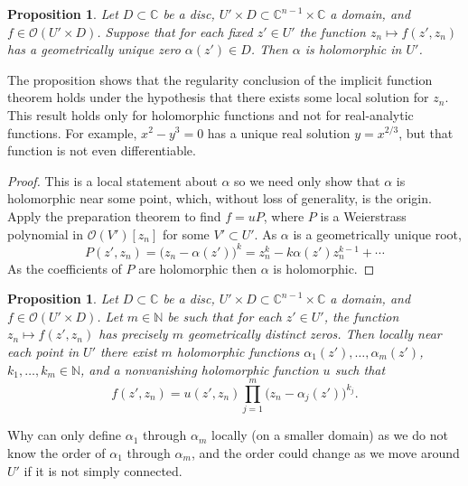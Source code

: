 \documentclass[12pt,openany]{book}
\newcommand{\C}{{\mathbb{C}}}
\newcommand{\N}{{\mathbb{N}}}
\newcommand{\sO}{{\mathcal{O}}}
\theoremstyle{plain}
\newtheorem{prop}[thm]{Proposition}
\theoremstyle{remark}
\theoremstyle{definition}
\theoremstyle{exercise}
\theoremstyle{example}
\begin{document}
\begin{prop} \label{prop:roothol}
Let $D \subset \C$ be a disc, 
$U' \times D \subset \C^{n-1} \times \C$ a domain,
and
$f \in \sO(U' \times D)$.
Suppose that for each fixed $z' \in U'$ the function
$z_n \mapsto f(z',z_n)$ has a geometrically unique zero $\alpha(z') \in D$.  Then $\alpha$ is
holomorphic in $U'$.
\end{prop}

The proposition shows that the regularity conclusion of the implicit
function theorem holds under the hypothesis that there exists some local
solution for $z_n$.  This result holds only for holomorphic
functions and not for real-analytic functions.  For example, $x^2-y^3 = 0$ has a
unique real solution $y = x^{2/3}$, but that function is not even
differentiable.

\begin{proof}
This is a local statement about $\alpha$ so we need only show
that $\alpha$ is holomorphic near some point, which, without loss
of generality, is the origin.
Apply the preparation
theorem to find $f = u P$,
where $P$ is a
Weierstrass polynomial in $\sO(V')[z_n]$ for some $V' \subset U'$.
As $\alpha$ is a geometrically unique root,
\begin{equation*}
P(z',z_n) = {\bigl(z_n-\alpha(z') \bigr)}^k = z_n^k - k \alpha(z') z_n^{k-1}
+ \cdots
\end{equation*}
As the coefficients of $P$ are holomorphic then $\alpha$ is holomorphic.
\end{proof}

\begin{prop} \label{prop:rootshol}
Let $D \subset \C$ be a disc, 
$U' \times D \subset \C^{n-1} \times \C$ a domain,
and
$f \in \sO(U' \times D)$.
Let $m \in \N$ be such that
for each $z' \in U'$, the function $z_n \mapsto f(z',z_n)$ has
precisely $m$ geometrically distinct zeros.
Then locally near each point in $U'$ there exist $m$ holomorphic functions
$\alpha_1(z'),\ldots,\alpha_m(z')$,
$k_1,\ldots,k_m \in \N$,
and a nonvanishing holomorphic function $u$
such that
\begin{equation*}
f(z',z_n) = u(z',z_n) \prod_{j=1}^m {\bigl( z_n - \alpha_j(z') \bigr)}^{k_j}
.
\end{equation*}
\end{prop}

Why can only define $\alpha_1$ through $\alpha_m$ locally (on a
smaller domain) as we do not know
the order of $\alpha_1$ through $\alpha_m$, and the order could change 
as we move around 
$U'$ if it is not simply connected.
\end{document}
